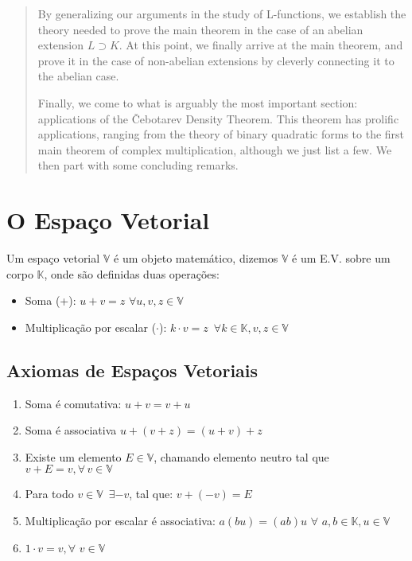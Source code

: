 \documentclass{article}
\theoremstyle{plain}
\theoremstyle{definition}
\theoremstyle{remark}
\numberwithin{equation}{section}
\numberwithin{thm}{section}
\begin{document}
\begin{abstract}
By generalizing our arguments in the study of L-functions, we establish the theory needed to prove the main theorem in the case of an abelian extension $L \supset K$. At this point, we finally arrive at the main theorem, and prove it in the case of non-abelian extensions by cleverly connecting it to the abelian case. 

Finally, we come to what is arguably the most important section: applications of the Čebotarev Density Theorem. This theorem has prolific applications, ranging from the theory of binary quadratic forms to the first main theorem of complex multiplication, although we just list a few. We then part with some concluding remarks. 

\end{abstract}




\section{O Espaço Vetorial}

Um espaço vetorial \(\mathbb{V}\) é um objeto matemático, dizemos \( \mathbb{V}\) é um E.V. sobre um corpo \(\mathbb{K}\), onde são definidas duas operações:

\begin{itemize}
	\item Soma (+): \(u+v = z \, \,\forall  u,v, z \in \mathbb{V}\)
	\item Multiplicação por escalar (\(\cdot\)): \(k\cdot v = z \, \, \, \forall k \in \mathbb{K}, v,z \in \mathbb{V}\)
\end{itemize}

\subsection*{Axiomas de Espaços Vetoriais}
\begin{enumerate}
\item Soma é comutativa: \(u+v = v+u\)
\item Soma é associativa \( u+(v+z) = (u+v)+z\)
\item Existe um elemento  \(E \in \mathbb{V}\), chamando elemento neutro tal que \(v + E = v, \forall \, v \in \mathbb{V}\)
\item Para todo \(v \in \mathbb{V} \,\,\, \exists -v\), tal que: \(v + (-v) = E\)
\item Multiplicação por escalar é associativa: \( a(b u) = (ab) u \, \, \forall \, \,  a, b \in \mathbb{K}, u \in \mathbb{V}\)
\item \( 1 \cdot v = v, \forall \, \, v \in \mathbb{V} \)
\end{enumerate}
\end{document}
